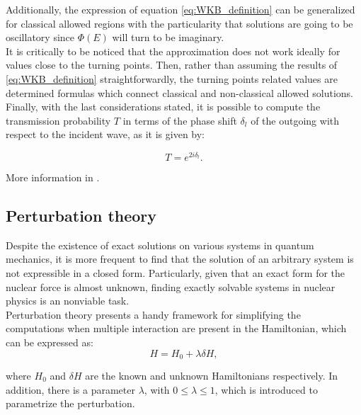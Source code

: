\documentclass[openany]{book}
\begin{document}
Additionally, the expression of equation \ref{eq:WKB_definition} can be generalized for classical allowed regions with the particularity that solutions are going to be oscillatory since $\Phi(E)$ will turn to be imaginary. \\

It is critically to be noticed that the approximation does not work ideally for values close to the turning points. Then, rather than assuming the results of \ref{eq:WKB_definition} straightforwardly, the turning points related values are determined formulas which connect classical and non-classical allowed solutions. \\

Finally, with the last considerations stated, it is possible to compute the transmission probability $T$ in terms of the phase shift $\delta_l$ of the outgoing with respect to the incident wave, as it  is given by: 
 
\begin{equation} \label{eq:tunneling_transmissionProbability}
	T = e^{2i\delta_l}.
\end{equation}

More information in \cite{newton_2002}.

\subsection{Perturbation theory}\label{sub:perturbationTheory}

Despite the existence of exact solutions on various systems in quantum mechanics, it is more frequent to find that the solution of an arbitrary system is not expressible in a closed form. Particularly, given that an exact form for the nuclear force is almost unknown, finding exactly solvable systems in nuclear physics is an nonviable task. \\

Perturbation theory presents a handy framework for simplifying the computations when multiple interaction are present in the Hamiltonian, which can be expressed as: \\

\begin{equation} \label{eq:perturbationTheory_hamiltonian}
	H = H_0 + \lambda \delta H,
\end{equation}

where $H_0$ and $\delta H$ are the known and unknown Hamiltonians respectively. In addition, there is a parameter $\lambda$, with $0 \le \lambda \le 1$, which is introduced to parametrize the perturbation. \\
\end{document}
